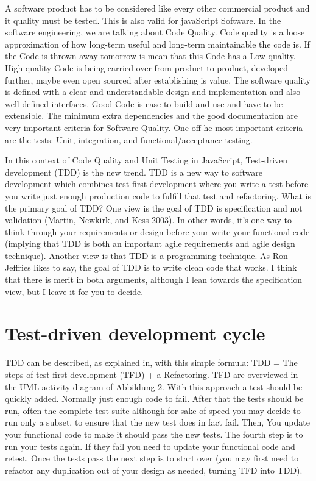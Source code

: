 \documentclass[11pt]{article}
\begin{document}
A software product has to be considered like every other commercial product and it quality must be tested. This is also valid for javaScript Software. In the software engineering, we are talking about Code Quality. Code quality is a loose approximation of how long-term useful and long-term maintainable the code is. If the Code is thrown away tomorrow is mean that this Code has a Low quality. High quality Code is being carried over from product to product, developed further, maybe even open sourced after establishing is value. The software quality is defined with a clear and understandable design and implementation and also well defined interfaces. Good Code is ease to build and use and have to be extensible. The minimum extra dependencies and the good documentation are very important criteria for Software Quality. One off he most important criteria are the tests: Unit, integration, and functional/acceptance testing.

In this context of Code Quality and Unit Testing in JavaScript, Test-driven development (TDD) is the new trend. TDD is a new way to software development which combines test-first development where you write a test before you write just enough production code to fulfill that test and refactoring. What is the primary goal of TDD? One view is the goal of TDD is specification and not validation (Martin, Newkirk, and Kess 2003). In other words, it’s one way to think through your requirements or design before your write your functional code (implying that TDD is both an important agile requirements and agile design technique). Another view is that TDD is a programming technique. As Ron Jeffries likes to say, the goal of TDD is to write clean code that works. I think that there is merit in both arguments, although I lean towards the specification view, but I leave it for you to decide. 

\section{Test-driven development cycle}

TDD can be described, as explained in, with this simple formula: TDD = The steps of test first development (TFD) + a Refactoring. TFD are overviewed in the UML activity diagram of Abbildung 2. With this approach a test should be quickly added. Normally just enough code to fail. After that the tests should be run, often the complete test suite although for sake of speed you may decide to run only a subset, to ensure that the new test does in fact fail. Then, You update your functional code to make it should pass the new tests. The fourth step is to run your tests again. If they fail you need to update your functional code and retest. Once the tests pass the next step is to start over (you may first need to refactor any duplication out of your design as needed, turning TFD into TDD).
\end{document}
